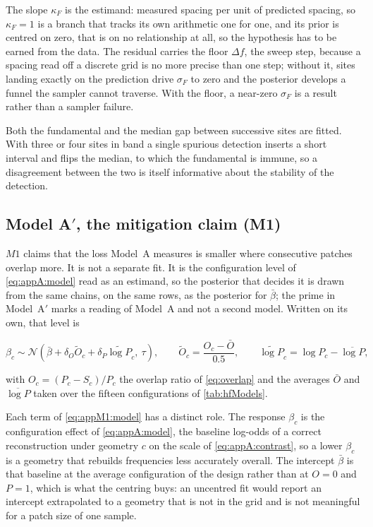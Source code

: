 The slope $\kappa_F$ is the estimand: measured spacing per unit of predicted spacing, so $\kappa_F=1$ is a branch that tracks its own arithmetic one for one, and its prior is centred on zero, that is on no relationship at all, so the hypothesis has to be earned from the data. The residual carries the floor $\Delta f$, the sweep step, because a spacing read off a discrete grid is no more precise than one step; without it, sites landing exactly on the prediction drive $\sigma_F$ to zero and the posterior develops a funnel the sampler cannot traverse. With the floor, a near-zero $\sigma_F$ is a result rather than a sampler failure.

Both the fundamental and the median gap between successive sites are fitted. With three or four sites in band a single spurious detection inserts a short interval and flips the median, to which the fundamental is immune, so a disagreement between the two is itself informative about the stability of the detection.

\subsection{Model A$'$, the mitigation claim (M1)}

$M1$ claims that the loss Model~A measures is smaller where consecutive patches overlap more. It is not a separate fit. It is the configuration level of \autoref{eq:appA:model} read as an estimand, so the posterior that decides it is drawn from the same chains, on the same rows, as the posterior for $\bar\beta$; the prime in Model~A$'$ marks a reading of Model~A and not a second model. Written on its own, that level is

\begin{equation}
\label{eq:appM1:model}
\beta_c \sim \mathcal{N}\!\left(\bar\beta + \delta_O \widetilde O_c + \delta_P \widetilde{\log P}_c,\ \tau\right),
\qquad
\widetilde O_c=\frac{O_c-\bar O}{0.5},
\qquad
\widetilde{\log P}_c=\log P_c-\overline{\log P},
\end{equation}

with $O_c=(P_c-S_c)/P_c$ the overlap ratio of \autoref{eq:overlap} and the averages $\bar O$ and $\overline{\log P}$ taken over the fifteen configurations of \autoref{tab:hfModels}.

Each term of \autoref{eq:appM1:model} has a distinct role. The response $\beta_c$ is the configuration effect of \autoref{eq:appA:model}, the baseline log-odds of a correct reconstruction under geometry $c$ on the scale of \autoref{eq:appA:contrast}, so a lower $\beta_c$ is a geometry that rebuilds frequencies less accurately overall. The intercept $\bar\beta$ is that baseline at the average configuration of the design rather than at $O=0$ and $P=1$, which is what the centring buys: an uncentred fit would report an intercept extrapolated to a geometry that is not in the grid and is not meaningful for a patch size of one sample.

